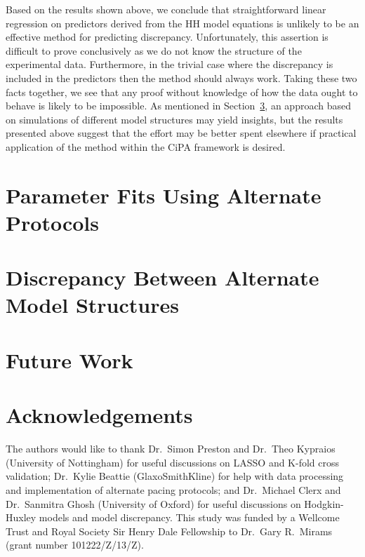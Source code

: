 \documentclass[11pt,a4paper,oneside]{article}
\begin{document}
Based on the results shown above, we conclude that straightforward linear regression on predictors derived from the HH model equations is unlikely to be an effective method for predicting discrepancy. Unfortunately, this assertion is difficult to prove conclusively as we do not know the structure of the experimental data. Furthermore, in the trivial case where the discrepancy is included in the predictors then the method should always work. Taking these two facts together, we see that any proof without knowledge of how the data ought to behave is likely to be impossible. As mentioned in Section~\ref{Sec_FutureWork}, an approach based on simulations of different model structures may yield insights, but the results presented above suggest that the effort may be better spent elsewhere if practical application of the method within the CiPA framework is desired. 

\section{Parameter Fits Using Alternate Protocols}

\section{Discrepancy Between Alternate Model Structures}\label{Sec_ModelDiscrepancy}

\section{Future Work}\label{Sec_FutureWork}

\section{Acknowledgements}
The authors would like to thank Dr.~Simon Preston and Dr.~Theo Kypraios (University of Nottingham) for useful discussions on LASSO and K-fold cross validation; Dr.~Kylie Beattie (GlaxoSmithKline) for help with data processing and implementation of alternate pacing protocols; and Dr.~Michael Clerx and Dr.~Sanmitra Ghosh (University of Oxford) for useful discussions on Hodgkin-Huxley models and model discrepancy. This study was funded by a Wellcome Trust and Royal Society Sir Henry Dale Fellowship to Dr.~Gary R.~Mirams (grant number 101222/Z/13/Z).



\end{document}
